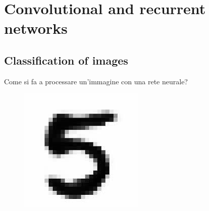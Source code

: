 \section{Convolutional and recurrent networks}

\subsection{Classification of images}

Come si fa a processare un'immagine con una rete neurale?\\

\begin{figure}[ht]
	\centering
	\includegraphics[width=0.3\linewidth]{figure_ml/classif.png}
\end{figure}
\FloatBarrier

